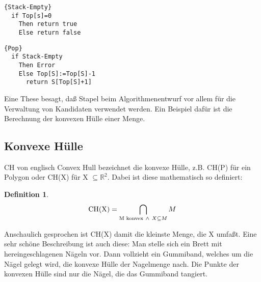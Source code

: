 \documentclass[ngerman,draft,parskip=half*,twoside]{scrreprt}
\theoremstyle{break}
\newtheorem{definition}{Definition}
\begin{document}
\begin{Algorithmus}[H]
\begin{lstlisting}[frame=tlrb, mathescape=true, title=\textsc{Stack-Empty}, gobble=1]{Stack-Empty}
  if Top[s]=0 
    Then return true
    Else return false
\end{lstlisting}
\end{Algorithmus}

\begin{Algorithmus}[H]
\begin{lstlisting}[frame=tlrb, mathescape=true, title=\textsc{Pop}, gobble=1]{Pop}
  if Stack-Empty
    Then Error
    Else Top[S]:=Top[S]-1
      return S[Top[S]+1]
\end{lstlisting}
\end{Algorithmus}

Eine These besagt, daß Stapel beim Algorithmenentwurf vor allem für die Verwaltung von Kandidaten verwendet werden. Ein Beispiel
dafür ist die Berechnung der konvexen Hülle einer Menge.

\subsection{Konvexe Hülle}
CH von englisch Convex Hull bezeichnet die konvexe Hülle, z.B. CH(P) für ein Polygon oder CH(X) für X $\subseteq \mathbb{R}^2$. Dabei
ist diese mathematisch so definiert:
\begin{definition}
\[\mbox{CH(X)}=\bigcap_{\textnormal{M konvex}\ \wedge \ X \subseteq M} M\]
\end{definition}
Anschaulich gesprochen ist CH(X) damit die kleinste Menge, die X umfaßt. Eine sehr schöne Beschreibung ist auch diese: Man stelle sich
ein Brett mit hereingeschlagenen Nägeln vor. Dann vollzieht ein Gummiband, welches um die Nägel gelegt wird, die konvexe Hülle der
Nagelmenge nach. Die Punkte der konvexen Hülle sind nur die Nägel, die das Gummiband tangiert. 
\end{document}
